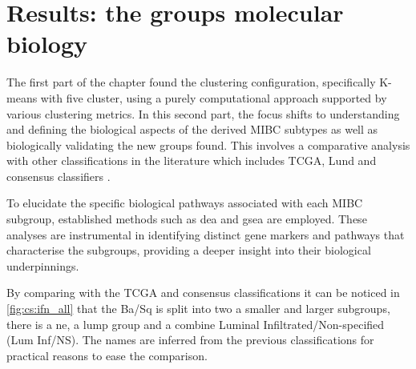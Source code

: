 \section{Results: the groups molecular biology} \label{s:cs:bio_interp}


The first part of the chapter found the clustering configuration, specifically K-means with five cluster, using a purely computational approach supported by various clustering metrics. In this second part, the focus shifts to understanding and defining the biological aspects of the derived MIBC subtypes as well as biologically validating the new groups found. This involves a comparative analysis with other classifications in the literature which includes TCGA, Lund and consensus classifiers \citep{Robertson2017-mg, Marzouka2018-ge,Kamoun2020-tj}.

To elucidate the specific biological pathways associated with each MIBC subgroup, established methods such as \acrfull{dea} and \acrfull{gsea} are employed. These analyses are instrumental in identifying distinct gene markers and pathways that characterise the subgroups, providing a deeper insight into their biological underpinnings.

By comparing with the TCGA and consensus classifications \citep{Robertson2017-mg,Kamoun2020-tj} it can be noticed in \cref{fig:cs:ifn_all} that the Ba/Sq is split into two a smaller and larger subgroups, there is a \acrfull{ne}, a \acrfull{lump} group and a combine Luminal Infiltrated/Non-specified (Lum Inf/NS). The names are inferred from the previous classifications for practical reasons to ease the comparison.


